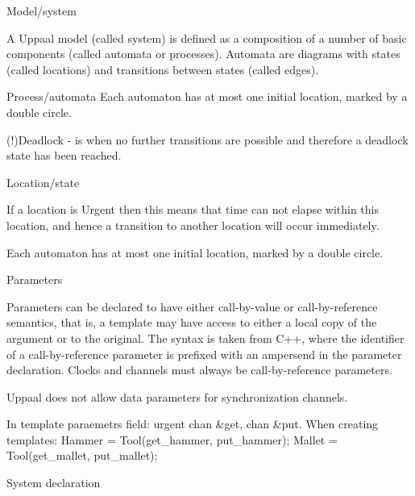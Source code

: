 \documentclass{beamer}
\begin{document}
\begin{frame}{Model/system}
	
	A Uppaal model (called system) is defined as a composition of a number of basic components (called automata or processes). Automata are diagrams with states
	(called locations) and transitions between states (called edges).\newline

\end{frame}

\begin{frame}{Process/automata}
	Each automaton has at most one initial location, marked
	by a double circle.
	
	(!)Deadlock - is when no further transitions are possible and therefore a deadlock state
	has been reached.
\end{frame}

\begin{frame}{Location/state}
	
	If a location is Urgent then this means that time can not elapse within this
	location, and hence a transition to another location will occur immediately.
	
	Each automaton has at most one initial location, marked
	by a double circle.
\end{frame}

\begin{frame}{Parameters}
	
	Parameters can be declared to have either call-by-value or call-by-reference semantics, that is, a template may have access to either a local copy of the argument or to the original. The syntax is taken from C++, where the identifier of a call-by-reference parameter is prefixed with an ampersend in the parameter declaration. Clocks and channels must always be call-by-reference parameters.
	
	
	Uppaal does not allow
	data parameters for synchronization channels.
	
	In template paraemetrs field: urgent chan \&get, chan \&put.
	When creating templates:
	Hammer = Tool(get\_hammer, put\_hammer);
	Mallet = Tool(get\_mallet, put\_mallet);
\end{frame}

\begin{frame}{System declaration}
	
\end{frame}
\end{document}
